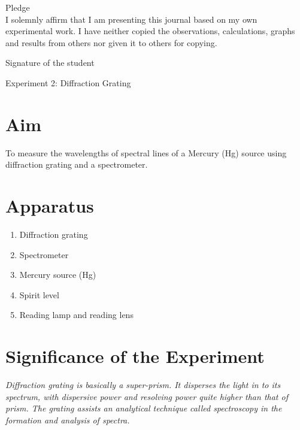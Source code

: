 \documentclass[11pt]{article}
\begin{document}
	\begin{center}
	{\Large Pledge}\\
	\vspace{0.5cm}
	I solemnly affirm that I am presenting this journal based on my own experimental work. I have neither copied the observations, calculations, graphs and results from others nor given it to others for copying.\\
		\end{center}
	
	\vspace{0.5cm}
	
    \begin{flushright}
	{\large Signature of the student}\\
	\vspace{1cm}
	 \end{flushright}
	
	
	
	\begin{center}
		{\LARGE Experiment 2: Diffraction Grating}\\
	\end{center}

	\section{Aim}
	\noindent
To measure the wavelengths of spectral lines of a Mercury (Hg) source using diffraction
grating and a spectrometer.
	
	\section{Apparatus}


		\begin{enumerate}
			\item Diffraction grating
			\item Spectrometer
			\item Mercury source (Hg)
			\item Spirit level
			\item Reading lamp and reading lens
		\end{enumerate}


	\section{Significance of the Experiment}
	\textit{Diffraction grating is basically a super-prism. It disperses the light in to its spectrum, with dispersive power and resolving power quite higher than that of
		prism. The grating assists an analytical technique called spectroscopy in the formation and
		analysis of spectra.}
	
\end{document}
